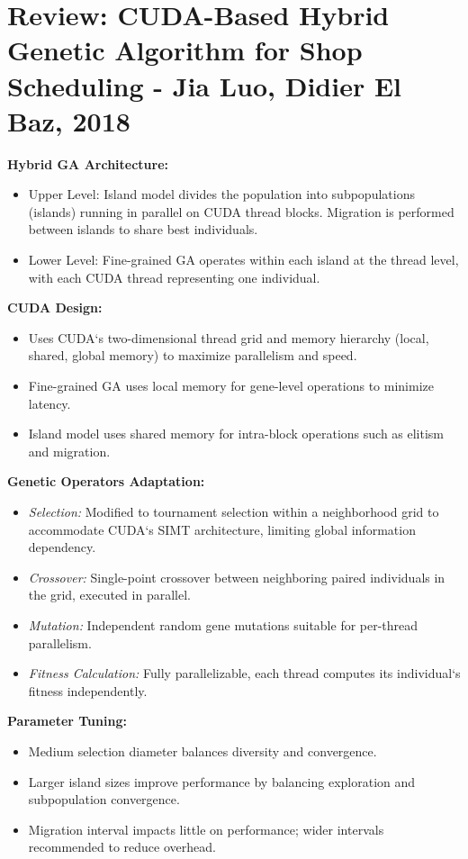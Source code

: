 \documentclass{article}
\begin{document}
\section*{Review: CUDA-Based Hybrid Genetic Algorithm for Shop Scheduling - Jia Luo, Didier El Baz, 2018}

\item \textbf{Hybrid GA Architecture:} 
\begin{itemize}
    \item Upper Level: Island model divides the population into subpopulations (islands) running in parallel on CUDA thread blocks. Migration is performed between islands to share best individuals.
    \item Lower Level: Fine-grained GA operates within each island at the thread level, with each CUDA thread representing one individual.
\end{itemize}

\item \textbf{CUDA Design:}
\begin{itemize}
    \item Uses CUDA`s two-dimensional thread grid and memory hierarchy (local, shared, global memory) to maximize parallelism and speed.
    \item Fine-grained GA uses local memory for gene-level operations to minimize latency.
    \item Island model uses shared memory for intra-block operations such as elitism and migration.
\end{itemize}

\item \textbf{Genetic Operators Adaptation:}
\begin{itemize}
    \item \textit{Selection:} Modified to tournament selection within a neighborhood grid to accommodate CUDA`s SIMT architecture, limiting global information dependency.
    \item \textit{Crossover:} Single-point crossover between neighboring paired individuals in the grid, executed in parallel.
    \item \textit{Mutation:} Independent random gene mutations suitable for per-thread parallelism.
    \item \textit{Fitness Calculation:} Fully parallelizable, each thread computes its individual`s fitness independently.
\end{itemize}

\item \textbf{Parameter Tuning:}
\begin{itemize}
    \item Medium selection diameter balances diversity and convergence.
    \item Larger island sizes improve performance by balancing exploration and subpopulation convergence.
    \item Migration interval impacts little on performance; wider intervals recommended to reduce overhead.
\end{itemize}
\end{document}
